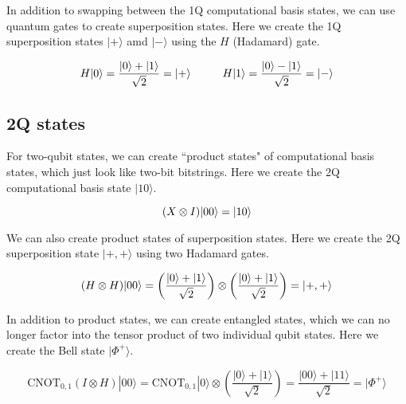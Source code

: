 \documentclass[12pt, letterpaper]{article}
\begin{document}
\noindent
In addition to swapping between the 1Q computational basis states, we can use quantum gates to create superposition states. Here we create the 1Q superposition states $|+\rangle$ amd $|-\rangle$ using the $H$ (Hadamard) gate.\vspace{2 mm}

\begin{equation}
H|0\rangle = \dfrac{|0\rangle + |1\rangle}{\sqrt{2}} = |+\rangle \hspace{1 cm} H|1\rangle = \dfrac{|0\rangle - |1\rangle}{\sqrt{2}} = |-\rangle
\end{equation}

\subsection{2Q states}

For two-qubit states, we can create ``product states" of computational basis states, which just look like two-bit bitstrings. Here we create the 2Q computational basis state $|10\rangle$.

\begin{equation}
(X \otimes I)|00\rangle = |10\rangle \vspace{3 mm}
\end{equation}

\noindent
We can also create product states of superposition states. Here we create the 2Q superposition state $|+,+\rangle$ using two Hadamard gates.\vspace{2 mm}

\begin{equation}
(H \otimes H)|00\rangle = \left( \dfrac{|0\rangle + |1\rangle}{\sqrt{2}}\right) \otimes \left( \dfrac{|0\rangle + |1\rangle}{\sqrt{2}}\right) = |+,+\rangle \vspace{4 mm}
\end{equation}

\noindent
In addition to product states, we can create entangled states, which we can no longer factor into the tensor product of two individual qubit states. Here we create the Bell state $|\Phi^+\rangle$.

\vspace{2 mm}
\begin{equation}
\text{CNOT}_{0,1}(I \otimes H)|00\rangle = \text{CNOT}_{0,1}|0\rangle \otimes \left( \dfrac{|0\rangle + |1\rangle}{\sqrt{2}}\right) = \dfrac{|00\rangle + |11\rangle}{\sqrt{2}} = |\Phi^+\rangle
\end{equation}
\end{document}
